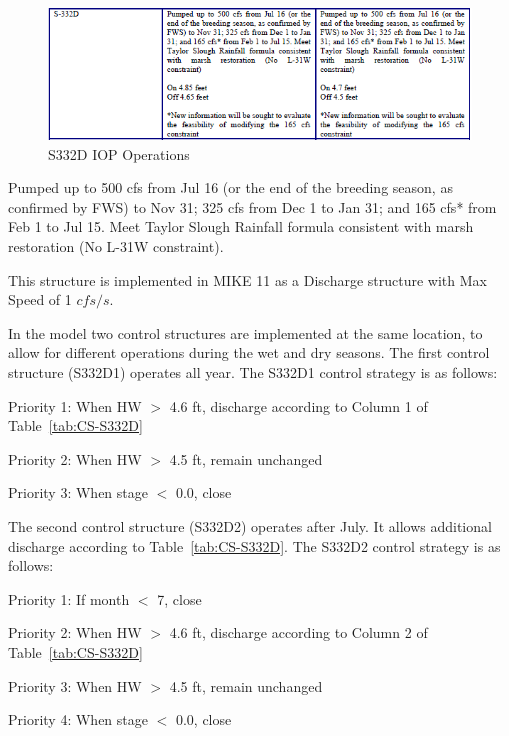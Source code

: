 \begin{figure}[!h]
  \begin{center}
  \includegraphics[width=6.5in]{../figs/S332D_IOPops.png}
  \caption{S332D IOP Operations}
  \label{fig:S332Diop}
  \end{center}
\end{figure}

Pumped up to 500 cfs from Jul 16 (or the end of the breeding season, as confirmed by FWS) to Nov 31; 325 cfs from Dec 1 to Jan 31; and 165 cfs* from Feb 1 to Jul 15. Meet Taylor Slough Rainfall formula consistent with marsh restoration (No L-31W constraint).

This structure is implemented in MIKE 11 as a Discharge structure with Max Speed of 1 $cfs/s$.


In the model two control structures are implemented at the same location, to allow for different operations during the wet and dry seasons. The first control structure (S332D1) operates all year.  The S332D1 control strategy is as follows:

\begin{packed_items}
\item Priority 1: When HW $>$ 4.6 ft, discharge according to Column 1 of Table~\ref{tab:CS-S332D}
\item Priority 2: When HW $>$ 4.5 ft, remain unchanged
\item Priority 3: When stage $<$ 0.0, close
\end{packed_items}

The second control structure (S332D2) operates after July. It allows additional discharge according to Table~\ref{tab:CS-S332D}. The S332D2 control strategy is as follows:
\begin{packed_items}
\item Priority 1: If month $<$ 7, close
\item Priority 2: When HW $>$ 4.6 ft, discharge according to Column 2 of Table~\ref{tab:CS-S332D}
\item Priority 3: When HW $>$ 4.5 ft, remain unchanged
\item Priority 4: When stage $<$ 0.0, close
\end{packed_items}

